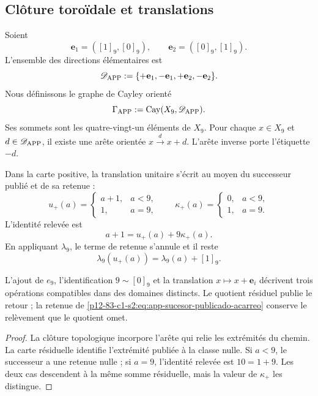 \subsection{Clôture toroïdale et translations}

Soient
\[
 \mathbf e_1=([1]_9,[0]_9),
 \qquad
 \mathbf e_2=([0]_9,[1]_9).
\]
L’ensemble des directions élémentaires est
\[
 \mathscr D_{\rm APP}:=
 \{+\mathbf e_1,-\mathbf e_1,+\mathbf e_2,-\mathbf e_2\}.
\]
Nous définissons le graphe de Cayley orienté
\[
 \Gamma_{\rm APP}:=\operatorname{Cay}(X_9,\mathscr D_{\rm APP}).
\]
Ses sommets sont les quatre-vingt-un éléments de \(X_9\). Pour chaque
\(x\in X_9\) et \(d\in\mathscr D_{\rm APP}\), il existe une arête orientée
\(x\xrightarrow{d}x+d\). L’arête inverse porte l’étiquette \(-d\).

Dans la carte positive, la translation unitaire s’écrit au moyen du successeur
publié et de sa retenue :
\[
 u_+(a)=
 \begin{cases}
  a+1,&a<9,\\
  1,&a=9,
 \end{cases}
 \qquad
 \kappa_+(a)=
 \begin{cases}
  0,&a<9,\\
  1,&a=9.
 \end{cases}
\]
L’identité relevée est
\begin{equation}
 a+1=u_+(a)+9\kappa_+(a).
\label{p12-83-c1-s2:eq:app-sucesor-publicado-acarreo}
\end{equation}
En appliquant \(\lambda_9\), le terme de retenue s’annule et il reste
\[
 \lambda_9(u_+(a))=\lambda_9(a)+[1]_9.
\]

\begin{lemma}
\label{p12-83-c1-s2:lem:app-compatibilidad-cierre-residuo}
L’ajout de \(e_9\), l’identification \(9\sim[0]_9\) et la translation
\(x\mapsto x+\mathbf e_i\) décrivent trois opérations compatibles dans
des domaines distincts. Le quotient résiduel publie le retour ; la retenue de
\cref{p12-83-c1-s2:eq:app-sucesor-publicado-acarreo} conserve le relèvement que le
quotient omet.
\end{lemma}

\begin{proof}
La clôture topologique incorpore l’arête qui relie les extrémités du chemin. La
carte résiduelle identifie l’extrémité publiée à la classe nulle. Si
\(a<9\), le successeur a une retenue nulle ; si \(a=9\), l’identité relevée
est \(10=1+9\). Les deux cas descendent à la même somme résiduelle, mais la
valeur de \(\kappa_+\) les distingue.
\end{proof}

